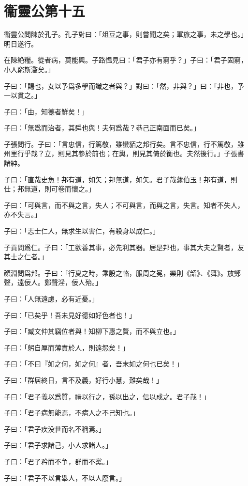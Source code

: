 \section[衞靈公第十五]{衞靈公第十五}

衞靈公問陳於孔子。孔子對曰：「俎豆之事，則嘗聞之矣；軍旅之事，未之學也。」明日遂行。

在陳絶糧。從者病，莫能興。子路愠見曰：「君子亦有窮乎？」子曰：「君子固窮，小人窮斯濫矣。」

子曰：「賜也，女以予爲多學而識之者與？」對曰：「然，非與？」曰：「非也，予一以貫之。」

子曰：「由，知德者鮮矣！」

子曰：「無爲而治者，其舜也與！夫何爲哉？恭己正南面而已矣。」

子張問行。子曰：「言忠信，行篤敬，雖蠻貊之邦行矣。言不忠信，行不篤敬，雖州里行乎哉？立，則見其參於前也；在輿，則見其倚於衡也。夫然後行。」子張書諸紳。

子曰：「直哉史魚！邦有道，如矢；邦無道，如矢。君子哉蘧伯玉！邦有道，則仕；邦無道，則可卷而懷之。」

子曰：「可與言，而不與之言，失人；不可與言，而與之言，失言。知者不失人，亦不失言。」

子曰：「志士仁人，無求生以害仁，有殺身以成仁。」

子貢問爲仁。子曰：「工欲善其事，必先利其器。居是邦也，事其大夫之賢者，友其士之仁者。」

顔淵問爲邦。子曰：「行夏之時，乘殷之輅，服周之冕，樂則《韶》、《舞》。放鄭聲，遠佞人。鄭聲淫，佞人殆。」

子曰：「人無遠慮，必有近憂。」

子曰：「已矣乎！吾未見好德如好色者也！」

子曰：「臧文仲其竊位者與！知柳下惠之賢，而不與立也。」

子曰：「躬自厚而薄責於人，則遠怨矣！」

子曰：「不曰『如之何，如之何』者，吾末如之何也已矣！」

子曰：「群居終日，言不及義，好行小慧，難矣哉！」

子曰：「君子義以爲質，禮以行之，孫以出之，信以成之。君子哉！」

子曰：「君子病無能焉，不病人之不己知也。」

子曰：「君子疾没世而名不稱焉。」

子曰：「君子求諸己，小人求諸人。」

子曰：「君子矜而不争，群而不黨。」

子曰：「君子不以言舉人，不以人廢言。」

